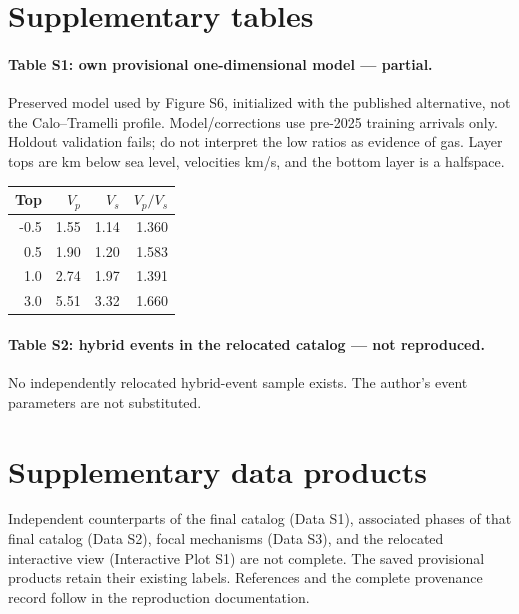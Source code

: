 \section*{Supplementary tables}
\paragraph{Table S1: own provisional one-dimensional model --- partial.} Preserved model used by Figure S6, initialized with the published alternative, not the Calo--Tramelli profile. Model/corrections use pre-2025 training arrivals only. Holdout validation fails; do not interpret the low ratios as evidence of gas. Layer tops are km below sea level, velocities km/s, and the bottom layer is a halfspace.
\begin{center}\begin{tabular}{rrrr}\hline Top & $V_p$ & $V_s$ & $V_p/V_s$\\\hline
-0.5 & 1.55 & 1.14 & 1.360\\
0.5 & 1.90 & 1.20 & 1.583\\
1.0 & 2.74 & 1.97 & 1.391\\
3.0 & 5.51 & 3.32 & 1.660\\
\hline\end{tabular}\end{center}
\paragraph{Table S2: hybrid events in the relocated catalog --- not reproduced.}
No independently relocated hybrid-event sample exists. The author's event parameters are not substituted.

\section*{Supplementary data products}
Independent counterparts of the final catalog (Data S1), associated phases of that final catalog (Data S2), focal mechanisms (Data S3), and the relocated interactive view (Interactive Plot S1) are not complete. The saved provisional products retain their existing labels. References and the complete provenance record follow in the reproduction documentation.
